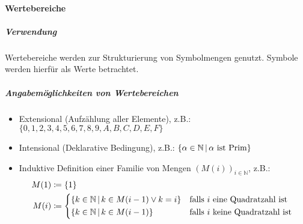 
					\paragraph{Wertebereiche}

						\subparagraph{Verwendung}
							Wertebereiche werden zur Strukturierung von Symbolmengen genutzt. Symbole werden hierfür als Werte betrachtet.

							\subparagraph{Angabemöglichkeiten von Wertebereichen}
								\begin{itemize}
									\item Extensional (Aufzählung aller Elemente), z.B.: $ \{ 0, 1, 2, 3, 4, 5, 6, 7, 8, 9, A, B, C, D, E, F \} $
									\item Intensional (Deklarative Bedingung), z.B.: $ \{ \alpha \in \mathbb{N} \,\vert\, \alpha \text{ ist Prim} \} $
									\item Induktive Definition einer Familie von Mengen $ (M(i)) _ { i \in \mathbb{N} } $, z.B.:
										\begin{align*}
											M(1) & \coloneqq \{ 1 \}                                                                                                                 \\
											M(i) & \coloneqq \begin{cases*}
												                 \{ k \in \mathbb{N} \forwhich k \in M(i - 1) \lor k = i \} & \text{falls $ i $ eine Quadratzahl ist}  \\
												                 \{ k \in \mathbb{N} \forwhich k \in M(i - 1) \}            & \text{falls $ i $ keine Quadratzahl ist} \\
											                 \end{cases*} \\
										\end{align*}
								\end{itemize}


